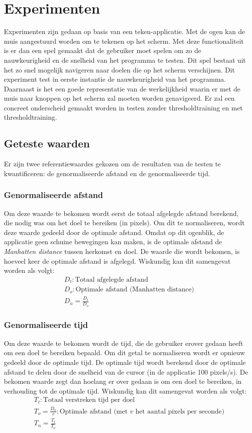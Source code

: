 \documentclass{article}
\begin{document}
\section{Experimenten}
Experimenten zijn gedaan op basis van een teken-applicatie. Met de ogen kan de muis aangestuurd worden om te tekenen op het scherm. Met deze functionaliteit is er dan een spel gemaakt dat de gebruiker moet spelen om zo de nauwkeurigheid en de snelheid van het programma te testen. Dit spel bestaat uit het zo snel mogelijk navigeren naar doelen die op het scherm verschijnen. Dit experiment test in eerste instantie de nauwkeurigheid van het programma. Daarnaast is het een goede representatie van de werkelijkheid waarin er met de muis naar knoppen op het scherm zal moeten worden genavigeerd. Er zal een concreet onderscheid gemaakt worden in testen zonder thresholdtraining en met thresholdtraining.
\subsection{Geteste waarden}
Er zijn twee referentiewaardes gekozen om de resultaten van de testen te kwantificeren: de genormaliseerde afstand en de genormaliseerde tijd.

\subsubsection*{Genormaliseerde afstand}
Om deze waarde te bekomen wordt eerst de totaal afgelegde afstand berekend, die nodig was om het doel te bereiken (in pixels). Om dit te normaliseren, wordt deze waarde gedeeld door de optimale afstand. Omdat op dit ogenblik, de applicatie geen schuine bewegingen kan maken, is de optimale afstand de \textit{Manhatten distance} \cite{manhdist} tussen herkomst en doel. De waarde die wordt bekomen, is hoeveel keer de optimale afstand is afgelegd. Wiskundig kan dit samengevat worden als volgt:
\begin{align*}
&D_t: \text{Totaal afgelegde afstand}\\
&D_o: \text{Optimale afstand (Manhatten distance)}\\
&D_n = \frac{D_t}{D_o}
\end{align*}

\subsubsection*{Genormaliseerde tijd}
Om deze waarde te bekomen wordt de tijd, die de gebruiker erover gedaan heeft om een doel te bereiken bepaald. Om dit getal te normaliseren wordt er opnieuw gedeeld door de optimale tijd. De optimale tijd wordt berekend door de optimale afstand te delen door de snelheid van de cursor (in de applicatie 100 pixels/s). De bekomen waarde zegt dan hoelang er over gedaan is om een doel te bereiken, in verhouding tot de optimale tijd. Wiskundig kan dit samengevat worden als volgt:
\begin{align*}
&T_t: \text{Totaal verstreken tijd per doel}\\
&T_o = \frac{D_o}{v}: \text{Optimale afstand (met } v \text{ het aantal pixels per seconde)}\\
&T_n = \frac{T_t}{T_o}
\end{align*} 
\end{document}
